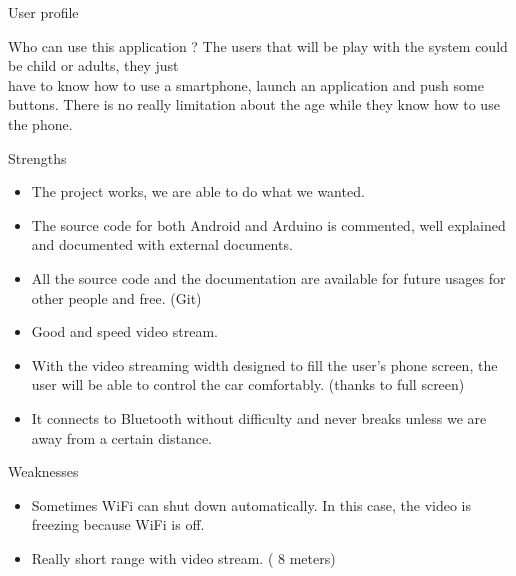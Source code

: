 \documentclass[xcolor=table, 9pt]{beamer}
\begin{document}
\begin{frame}{User profile}
\begin{block}{Who can use this application ?}
The users that will be play with the system could be child or adults, they just\\ \vspace{0.2cm}
have to know how to use a smartphone, launch an application and push some\\ \vspace{0.2cm} buttons. There is no really limitation about the age while they know how to use\\ \vspace{0.2cm} the phone.
\end{block}
\end{frame}


\begin{frame}{Strengths}
\begin{itemize}
\item The project works, we are able to do what we wanted.
\vspace{0.2cm}
\item The source code for both Android and Arduino is commented, well explained and documented with external documents.
\vspace{0.2cm}
\item All the source code and the documentation are available for future usages for other people and free. (Git)
\vspace{0.2cm}
\item Good and speed video stream.
\vspace{0.2cm}
\item With the video streaming width designed to fill the user’s phone screen, the user will be able to control the car comfortably. (thanks to full screen)
\vspace{0.2cm}
\item It connects to Bluetooth without difficulty and never breaks unless we are away from a certain distance.
\end{itemize}
\end{frame}

\begin{frame}{Weaknesses}
\begin{itemize}
\item Sometimes WiFi can shut down automatically. In this case, the video is freezing because WiFi is off.
\vspace{0.2cm}
\item Really short range with video stream. ( 8 meters)
\end{itemize}

\end{frame}
\end{document}
